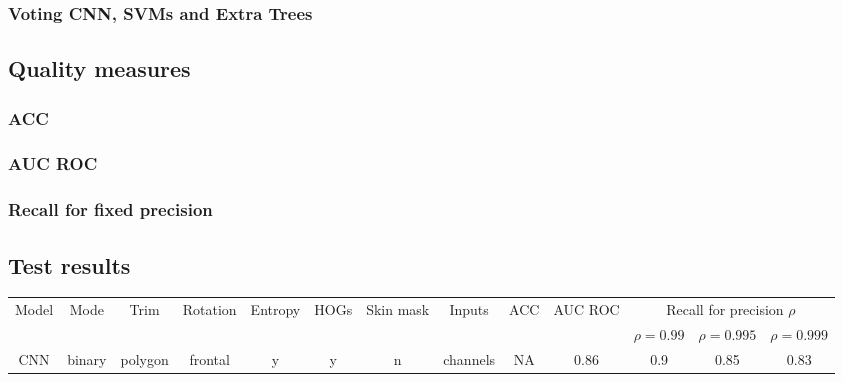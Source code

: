         \subsubsection*{Voting CNN, SVMs and Extra Trees}

    \subsection{Quality measures}
        \subsubsection*{ACC}

        \subsubsection*{AUC ROC}

        \subsubsection*{Recall for fixed precision}


    \subsection{Test results}
        \begin{tabular}{ |c|c|c|c|c|c|c|c|c|c|c|c|c| }
            \hline
            \multirow{2}{*}{Model} &
            \multirow{2}{*}{Mode} &
            \multirow{2}{*}{Trim} &
            \multirow{2}{*}{Rotation} &
            \multirow{2}{*}{Entropy} &
            \multirow{2}{*}{HOGs} &
            \multirow{2}{*}{Skin mask} &
            \multirow{2}{*}{Inputs} &
            \multirow{2}{*}{ACC} &
            \multirow{2}{*}{AUC ROC} &
            \multicolumn{3}{|c|}{Recall for precision $\rho$} \\
            & & & & & & & & & & $\rho = 0.99$ & $\rho = 0.995$ & $\rho = 0.999$ \\
            \hline
            CNN & binary & polygon & frontal & y & y & n & channels & NA & 0.86 & 0.9 & 0.85 & 0.83 \\
            \hline
        \end{tabular}
